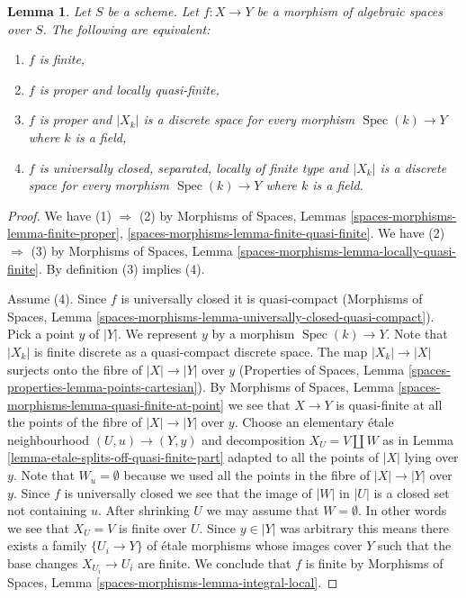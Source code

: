 \documentclass[10pt,a4paper]{amsart}
\theoremstyle{plain}
\newtheorem{lemma}[subsection]{Lemma}
\theoremstyle{definition}
\theoremstyle{remark}
\numberwithin{equation}{subsection}
\def\Spec{\mathop{\mathrm{Spec}}}
\begin{document}
\begin{lemma}
\label{lemma-characterize-finite}
Let $S$ be a scheme. Let $f : X \to Y$ be a morphism of algebraic spaces
over $S$. The following are equivalent:
\begin{enumerate}
\item $f$ is finite,
\item $f$ is proper and locally quasi-finite,
\item $f$ is proper and $|X_k|$ is a discrete space for every morphism
$\Spec(k) \to Y$ where $k$ is a field,
\item $f$ is universally closed, separated, locally of finite type
and $|X_k|$ is a discrete space for every morphism $\Spec(k) \to Y$
where $k$ is a field.
\end{enumerate}
\end{lemma}

\begin{proof}
We have (1) $\Rightarrow$ (2) by
Morphisms of Spaces, Lemmas \ref{spaces-morphisms-lemma-finite-proper},
\ref{spaces-morphisms-lemma-finite-quasi-finite}.
We have (2) $\Rightarrow$ (3) by
Morphisms of Spaces, Lemma
\ref{spaces-morphisms-lemma-locally-quasi-finite}.
By definition (3) implies (4).

\medskip\noindent
Assume (4). Since $f$ is universally closed it is quasi-compact
(Morphisms of Spaces, Lemma
\ref{spaces-morphisms-lemma-universally-closed-quasi-compact}).
Pick a point $y$ of $|Y|$. We represent $y$ by a
morphism $\Spec(k) \to Y$. Note that $|X_k|$ is finite discrete
as a quasi-compact discrete space. The map $|X_k| \to |X|$ surjects
onto the fibre of $|X| \to |Y|$ over $y$
(Properties of Spaces, Lemma \ref{spaces-properties-lemma-points-cartesian}).
By
Morphisms of Spaces, Lemma \ref{spaces-morphisms-lemma-quasi-finite-at-point}
we see that $X \to Y$ is quasi-finite at all the points of the fibre
of $|X| \to |Y|$ over $y$.
Choose an elementary \'etale neighbourhood $(U, u) \to (Y, y)$
and decomposition $X_U = V \amalg W$ as in
Lemma \ref{lemma-etale-splits-off-quasi-finite-part}
adapted to all the points of $|X|$ lying over $y$.
Note that $W_u = \emptyset$ because we used all the points
in the fibre of $|X| \to |Y|$ over $y$.
Since $f$ is universally closed we see that
the image of $|W|$ in $|U|$ is a closed set not containing $u$.
After shrinking $U$ we may assume that $W = \emptyset$.
In other words we see that $X_U = V$ is finite over $U$.
Since $y \in |Y|$ was arbitrary
this means there exists a family $\{U_i \to Y\}$
of \'etale morphisms whose images cover $Y$ such that
the base changes $X_{U_i} \to U_i$ are finite.
We conclude that $f$ is finite by
Morphisms of Spaces, Lemma \ref{spaces-morphisms-lemma-integral-local}.
\end{proof}
\end{document}
